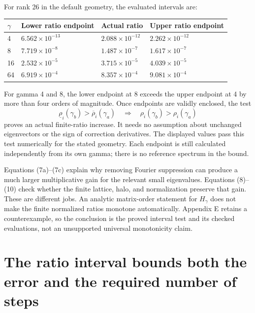 \documentclass[11pt]{article}
\begin{document}
\begin{samepage}
For rank 26 in the default geometry, the evaluated intervals are:

\begin{center}\small\begin{tabularx}{\linewidth}{lXXX}
\toprule
\(\gamma\) & Lower ratio endpoint & Actual ratio & Upper ratio endpoint \\
\midrule
4 & \(6.562\times10^{-13}\) & \(2.088\times10^{-12}\) & \(2.262\times10^{-12}\) \\
8 & \(7.719\times10^{-8}\) & \(1.487\times10^{-7}\) & \(1.617\times10^{-7}\) \\
16 & \(2.532\times10^{-5}\) & \(3.715\times10^{-5}\) & \(4.039\times10^{-5}\) \\
64 & \(6.919\times10^{-4}\) & \(8.357\times10^{-4}\) & \(9.081\times10^{-4}\) \\
\bottomrule\end{tabularx}\end{center}
\end{samepage}

For gamma 4 and 8, the lower endpoint at 8 exceeds the upper endpoint at 4 by more than four orders of magnitude. Once endpoints are validly enclosed, the test
\[
\underline\rho_i(\gamma_b)>\overline\rho_i(\gamma_a)
\quad\Longrightarrow\quad
\rho_i(\gamma_b)>\rho_i(\gamma_a)
\tag{10a}
\]
proves an actual finite-ratio increase. It needs no assumption about unchanged eigenvectors or the sign of correction derivatives. The displayed values pass this test numerically for the stated geometry. Each endpoint is still calculated independently from its own gamma; there is no reference spectrum in the bound.

Equations (7a)--(7c) explain why removing Fourier suppression can produce a much larger multiplicative gain for the relevant small eigenvalues. Equations (8)--(10) check whether the finite lattice, halo, and normalization preserve that gain. These are different jobs. An analytic matrix-order statement for \(H_\gamma\) does not make the finite normalized ratios monotone automatically. Appendix E retains a counterexample, so the conclusion is the proved interval test and its checked evaluations, not an unsupported universal monotonicity claim.

\section{The ratio interval bounds both the error and the required number of steps}
\end{document}
